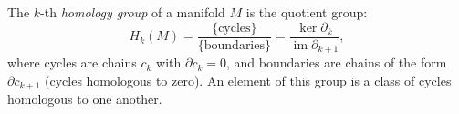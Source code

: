 The $k$-th \textit{homology group} of a manifold $M$ is the quotient group:
$$H_k(M) = \frac{\{\text{cycles}\}}{\{\text{boundaries}\}} = \frac{\ker \partial_k}{\operatorname{im} \partial_{k+1}},$$
where cycles are chains $c_k$ with $\partial c_k = 0$, and boundaries are chains of the form $\partial c_{k+1}$ (cycles homologous to zero). An element of this group is a class of cycles homologous to one another.
